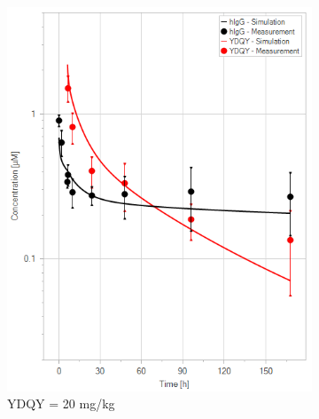 \documentclass[fleqn,10pt]{physiome}
\begin{document}
\begin{figure}[htb]
\begin{subfigure}{0.32\textwidth}
        \includegraphics[width=\textwidth]{pl13.png}
        \caption{YDQY = 20 mg/kg}
        \label{fig:7c}
    \end{subfigure}
    \hfill
    \begin{subfigure}{0.32\textwidth}

\end{subfigure}
\end{figure}
\end{document}
